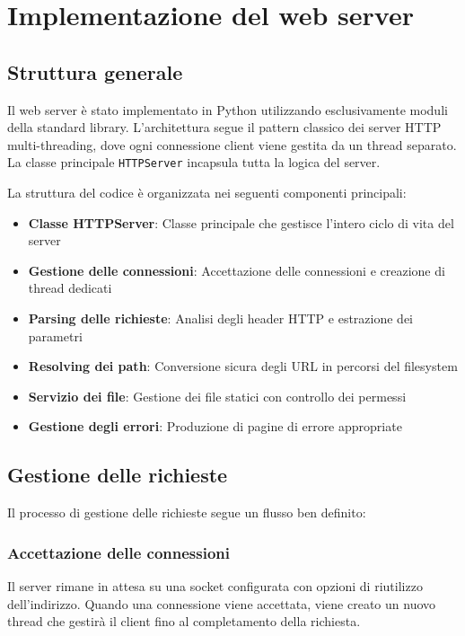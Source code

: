 \documentclass[a4paper,12pt]{report}
\begin{document}
\chapter{Implementazione del web server}
\section{Struttura generale}

Il web server è stato implementato in Python utilizzando esclusivamente moduli della standard library. L'architettura segue il pattern classico dei server HTTP multi-threading, dove ogni connessione client viene gestita da un thread separato. La classe principale \texttt{HTTPServer} incapsula tutta la logica del server.

La struttura del codice è organizzata nei seguenti componenti principali:

\begin{itemize}
    \item \textbf{Classe HTTPServer}: Classe principale che gestisce l'intero ciclo di vita del server
    \item \textbf{Gestione delle connessioni}: Accettazione delle connessioni e creazione di thread dedicati
    \item \textbf{Parsing delle richieste}: Analisi degli header HTTP e estrazione dei parametri
    \item \textbf{Resolving dei path}: Conversione sicura degli URL in percorsi del filesystem
    \item \textbf{Servizio dei file}: Gestione dei file statici con controllo dei permessi
    \item \textbf{Gestione degli errori}: Produzione di pagine di errore appropriate
\end{itemize}

\section{Gestione delle richieste}

Il processo di gestione delle richieste segue un flusso ben definito:

\subsection{Accettazione delle connessioni}
Il server rimane in attesa su una socket configurata con opzioni di riutilizzo dell'indirizzo. Quando una connessione viene accettata, viene creato un nuovo thread che gestirà il client fino al completamento della richiesta.
\end{document}
